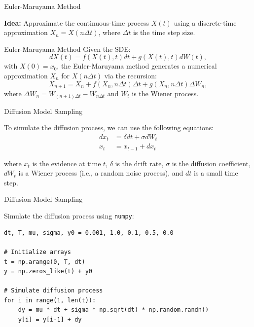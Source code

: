 \documentclass{beamer}
\newcommand{\module}[1]{{\color{brown}\texttt{#1}}}
\begin{document}
\begin{frame}{Euler-Maruyama Method}

\textbf{Idea:} Approximate the continuous-time process $X(t)$ using a discrete-time approximation $X_n = X(n \Delta t)$, where $\Delta t$ is the time step size.

\pause

\begin{block}{Euler-Maruyama Method}
    Given the SDE: 
    $$ dX(t) = f(X(t), t) dt + g(X(t), t) dW(t), $$
    with $X(0) = x_0$, the Euler-Maruyama method generates a numerical approximation $X_n$ for $X(n\Delta t)$ via the recursion: 
    $$ X_{n+1} = X_n + f(X_n, n\Delta t) \Delta t + g(X_n, n\Delta t) \Delta W_n,$$
    where $\Delta W_n = W_{(n+1)\Delta t} - W_{n\Delta t}$ and $W_t$ is the Wiener process.
\end{block}

\end{frame}



\begin{frame}{Diffusion Model Sampling}

To simulate the diffusion process, we can use the following equations:
\begin{align*}
dx_t &= \delta dt + \sigma dW_t \\
x_t &= x_{t-1} + dx_t
\end{align*}

where $x_t$ is the evidence at time $t$, $\delta$ is the drift rate, $\sigma$ is the diffusion coefficient, $dW_t$ is a Wiener process (i.e., a random noise process), and $dt$ is a small time step.

\end{frame}



\begin{frame}[fragile]{Diffusion Model Sampling}

Simulate the diffusion process using \module{numpy}:

\begin{lstlisting}[style=python]
dt, T, mu, sigma, y0 = 0.001, 1.0, 0.1, 0.5, 0.0

# Initialize arrays
t = np.arange(0, T, dt)
y = np.zeros_like(t) + y0

# Simulate diffusion process
for i in range(1, len(t)):
    dy = mu * dt + sigma * np.sqrt(dt) * np.random.randn()
    y[i] = y[i-1] + dy

\end{lstlisting}

\end{frame}
\end{document}
